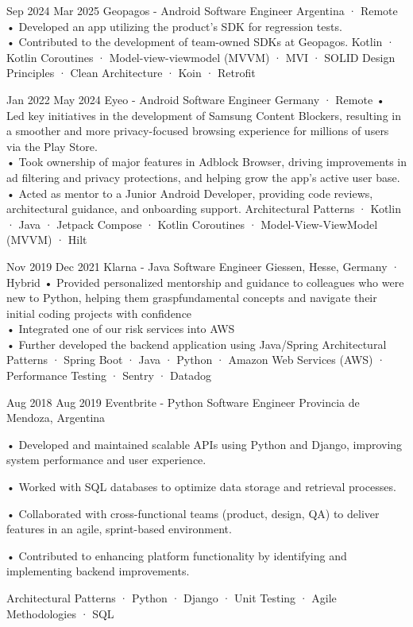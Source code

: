 \documentclass[a4paper,nocolors]{friggeri-cv}
\begin{document}
\begin{entrylist}


\entryexperience
{Sep 2024}
{Mar 2025}
{Geopagos - Android Software Engineer}
{Argentina · Remote}
{
• Developed an app utilizing the product's SDK for regression tests.\\
• Contributed to the development of team-owned SDKs at Geopagos.
}
{
  Kotlin · Kotlin Coroutines · Model-view-viewmodel (MVVM) · MVI · SOLID Design Principles · Clean Architecture · Koin · Retrofit
}


\entryexperience
{Jan 2022}
{May 2024}
{Eyeo - Android Software Engineer}
{Germany · Remote}
{
• Led key initiatives in the development of Samsung Content Blockers, resulting in a smoother and more privacy-focused browsing experience for millions of users via the Play Store.
\\
• Took ownership of major features in Adblock Browser, driving improvements in ad filtering and privacy protections, and helping grow the app’s active user base.
\\
• Acted as mentor to a Junior Android Developer, providing code reviews, architectural guidance, and onboarding support.
}
{
  Architectural Patterns · Kotlin · Java · Jetpack Compose · Kotlin Coroutines · Model-View-ViewModel (MVVM) · Hilt
}


\entryexperience
{Nov 2019}
{Dec 2021}
{Klarna - Java Software Engineer}
{Giessen, Hesse, Germany · Hybrid}
{
  • Provided personalized mentorship and guidance to colleagues who were new to Python, helping them graspfundamental concepts and navigate their initial coding projects with confidence
  \\
  • Integrated one of our risk services into AWS
  \\
  • Further developed the backend application using Java/Spring
}
{ 
  Architectural Patterns · Spring Boot  · Java · Python · Amazon Web Services (AWS) · Performance Testing · Sentry · Datadog
}


\entryexperience
{Aug 2018}
{Aug 2019}
{Eventbrite - Python Software Engineer}
{Provincia de Mendoza, Argentina}
{
  • Developed and maintained scalable APIs using Python and Django, improving system performance and user experience.

  • Worked with SQL databases to optimize data storage and retrieval processes.

  • Collaborated with cross-functional teams (product, design, QA) to deliver features in an agile, sprint-based environment.

  • Contributed to enhancing platform functionality by identifying and implementing backend improvements.
}
{
  Architectural Patterns · Python · Django · Unit Testing · Agile Methodologies · SQL
}


\end{entrylist}
\end{document}
